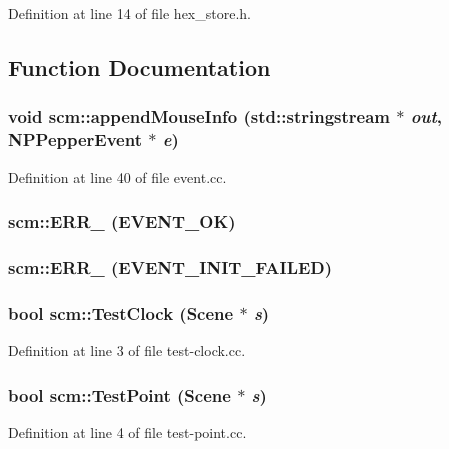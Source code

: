 Definition at line 14 of file hex\_\-store.h.



\subsection{Function Documentation}
\hypertarget{namespacescm_acb8f6b2f25d7c07de183bb8b8d518510}{
\subsubsection[{appendMouseInfo}]{\setlength{\rightskip}{0pt plus 5cm}void scm::appendMouseInfo (std::stringstream $\ast$ {\em out}, \/  NPPepperEvent $\ast$ {\em e})}}
\label{namespacescm_acb8f6b2f25d7c07de183bb8b8d518510}


Definition at line 40 of file event.cc.

\hypertarget{namespacescm_af343ae95ed75977e4da042874b9edacc}{
\subsubsection[{ERR\_\-}]{\setlength{\rightskip}{0pt plus 5cm}scm::ERR\_\- (EVENT\_\-OK)}}
\label{namespacescm_af343ae95ed75977e4da042874b9edacc}
\hypertarget{namespacescm_adbb7998a18f4d5b55f2d9af9146e27e9}{
\subsubsection[{ERR\_\-}]{\setlength{\rightskip}{0pt plus 5cm}scm::ERR\_\- (EVENT\_\-INIT\_\-FAILED)}}
\label{namespacescm_adbb7998a18f4d5b55f2d9af9146e27e9}
\hypertarget{namespacescm_a2f933647227de09b34772f194e579a63}{
\subsubsection[{TestClock}]{\setlength{\rightskip}{0pt plus 5cm}bool scm::TestClock (Scene $\ast$ {\em s})}}
\label{namespacescm_a2f933647227de09b34772f194e579a63}


Definition at line 3 of file test-\/clock.cc.

\hypertarget{namespacescm_aca67b9b84fd6253da0c69b4c521e6bc6}{
\subsubsection[{TestPoint}]{\setlength{\rightskip}{0pt plus 5cm}bool scm::TestPoint (Scene $\ast$ {\em s})}}
\label{namespacescm_aca67b9b84fd6253da0c69b4c521e6bc6}


Definition at line 4 of file test-\/point.cc.

